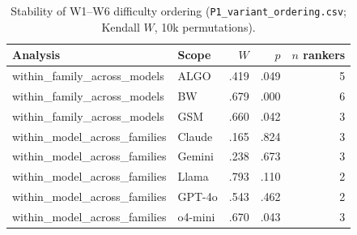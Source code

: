 \begin{table}[t]
\centering
\small
\caption{Stability of W1--W6 difficulty ordering
(\texttt{P1\_variant\_ordering.csv}; Kendall $W$, 10k permutations).}
\label{tab:variant-order}
\begin{tabular}{llrrr}
\toprule
Analysis & Scope & $W$ & $p$ & $n$ rankers \\
\midrule
within\_family\_across\_models & ALGO & .419 & .049 & 5 \\
within\_family\_across\_models & BW & .679 & .000 & 6 \\
within\_family\_across\_models & GSM & .660 & .042 & 3 \\
within\_model\_across\_families & Claude & .165 & .824 & 3 \\
within\_model\_across\_families & Gemini & .238 & .673 & 3 \\
within\_model\_across\_families & Llama & .793 & .110 & 2 \\
within\_model\_across\_families & GPT-4o & .543 & .462 & 2 \\
within\_model\_across\_families & o4-mini & .670 & .043 & 3 \\
\bottomrule
\end{tabular}
\end{table}
